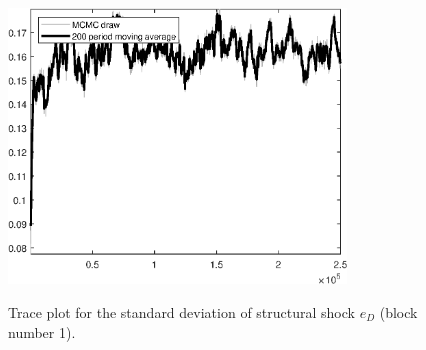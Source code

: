 \begin{figure}[H]
\centering
  \includegraphics[width=0.8\textwidth]{BRS_fd/graphs/TracePlot_SE_e_D_blck_1}\\
    \caption{Trace plot for the standard deviation of structural shock ${e_D}$ (block number 1).}
\end{figure}
